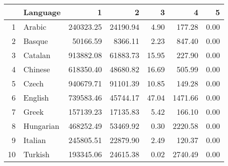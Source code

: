 \begin{table}[ht]
\centering
\begin{tabular}{rlrrrrr}
  \hline
 & Language & 1 & 2 & 3 & 4 & 5 \\ 
  \hline
1 & Arabic & 240323.25 & 24190.94 & 4.90 & 177.28 & 0.00 \\ 
  2 & Basque & 50166.59 & 8366.11 & 2.23 & 847.40 & 0.00 \\ 
  3 & Catalan & 913882.08 & 61883.73 & 15.95 & 227.90 & 0.00 \\ 
  4 & Chinese & 618350.40 & 48680.82 & 16.69 & 505.99 & 0.00 \\ 
  5 & Czech & 940679.71 & 91101.39 & 10.85 & 149.28 & 0.00 \\ 
  6 & English & 739583.46 & 45744.17 & 47.04 & 1471.66 & 0.00 \\ 
  7 & Greek & 157139.23 & 17135.83 & 5.42 & 166.10 & 0.00 \\ 
  8 & Hungarian & 468252.49 & 53469.92 & 0.30 & 2220.58 & 0.00 \\ 
  9 & Italian & 245805.51 & 22879.90 & 2.49 & 120.37 & 0.00 \\ 
  10 & Turkish & 193345.06 & 24615.38 & 0.02 & 2740.49 & 0.00 \\ 
   \hline
\end{tabular}
\end{table}
